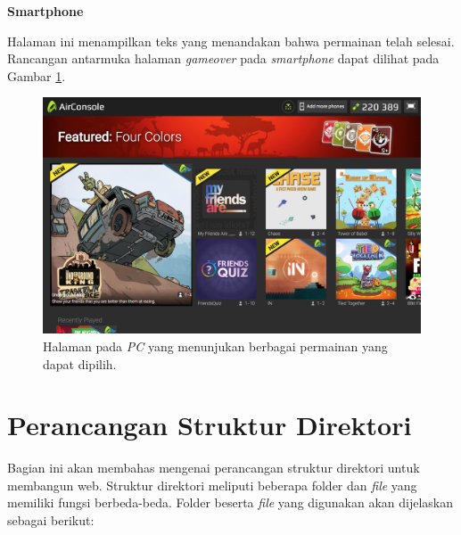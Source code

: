\begin{enumerate}
	\textbf{Smartphone}
	
	Halaman ini menampilkan teks yang menandakan bahwa permainan telah selesai. Rancangan antarmuka halaman \textit{gameover} pada \textit{smartphone} dapat dilihat pada Gambar \ref{fig:30_con3_play1}.
	
\begin{figure}[H]
	\centering
	\includegraphics[scale=0.3]{Gambar/con3_play1}
	\caption{Halaman pada \textit{PC} yang menunjukan berbagai permainan yang dapat dipilih.}
	\label{fig:30_con3_play1}
\end{figure}
	
\end{enumerate}

\section{Perancangan Struktur Direktori}

Bagian ini akan membahas mengenai perancangan struktur direktori untuk membangun web. Struktur direktori meliputi beberapa folder dan \textit{file} yang memiliki fungsi berbeda-beda. Folder beserta \textit{file} yang digunakan akan dijelaskan sebagai berikut:

